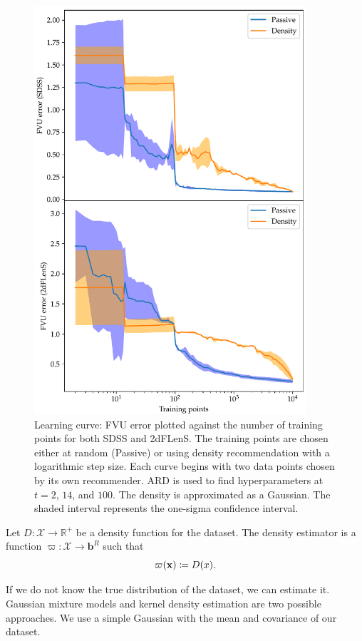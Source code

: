 \documentclass[11pt,twoside,openright]{report}
\newcommand\bbR{\mathbb{R}}
\newcommand\bb{\mathbf{b}}
\newcommand\bx{\mathbf{x}}
\newcommand\cX{\mathcal{X}}
\begin{document}
  \begin{figure}
    \centering
    \includegraphics[width=0.9\textwidth]{density_fvu1.pdf}
    \caption{Learning curve: FVU error plotted against the number of training points for both SDSS and 2dFLenS. The training points are chosen either at random (Passive) or using density recommendation with a logarithmic step size. Each curve begins with two data points chosen by its own recommender. ARD is used to find hyperparameters at $t=2$, $14$, and $100$. The density is approximated as a Gaussian. The shaded interval represents the one-sigma confidence interval.}
    \label{fig:density_fvu1}
  \end{figure}{}

  Let $D : \cX \to \bbR^+$ be a density function for the dataset. The density estimator is a function $\varpi : \cX \to \bb^R$ such that \[
    \varpi(\bx) \coloneqq D(x) \text.
  \]

  If we do not know the true distribution of the dataset, we can estimate it. Gaussian mixture models and kernel density estimation are two possible approaches. We use a simple Gaussian with the mean and covariance of our dataset.
\end{document}
